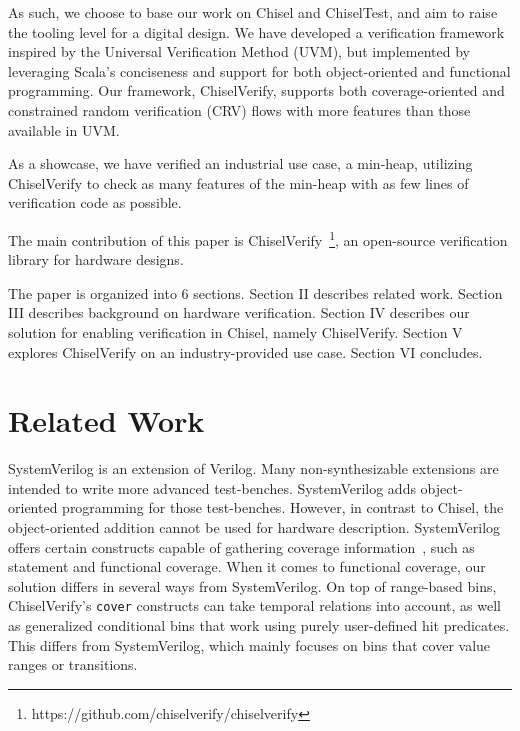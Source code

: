 \documentclass[conference]{IEEEtran}
\newcommand{\todo}[1]{{\color{olive} TODO: #1}}
\begin{document}
As such, we choose to base our work on Chisel and ChiselTest, and aim to raise %
the tooling level for a digital design. We have developed a verification framework %
inspired by the Universal Verification Method (UVM), but implemented by leveraging %
Scala's conciseness and support for both object-oriented and functional programming. %
Our framework, ChiselVerify, supports both coverage-oriented and constrained %
random verification (CRV) flows with more features than those available in UVM. %

As a showcase, we have verified an industrial use case, a min-heap, utilizing 
ChiselVerify to check as many features of the min-heap with as few lines of 
verification code as possible.

The main contribution of this paper is ChiselVerify~\footnote{https://github.com/chiselverify/chiselverify}, an open-source verification library for hardware designs.

The paper is organized into 6 sections.
Section II describes related work.
Section III describes background on hardware verification.
Section IV describes our solution for enabling verification in Chisel, namely ChiselVerify.
Section V explores ChiselVerify on an industry-provided use case.
Section VI concludes.

\section{Related Work}

SystemVerilog is an extension of Verilog. Many non-synthesizable extensions are intended
to write more advanced test-benches. SystemVerilog adds object-oriented programming
for those test-benches. However, in contrast to Chisel, the object-oriented addition cannot be
used for hardware description.
SystemVerilog offers certain constructs capable of gathering coverage information~\cite{spear2008systemverilog}, such as statement and functional coverage. 
When it comes to functional coverage, our solution differs in several ways from SystemVerilog. 
On top of range-based bins, ChiselVerify's \texttt{cover} constructs can take temporal relations into account, as well as generalized conditional bins that work using purely user-defined hit predicates.
This differs from SystemVerilog, which mainly focuses on bins that cover value ranges or transitions. 
\end{document}
